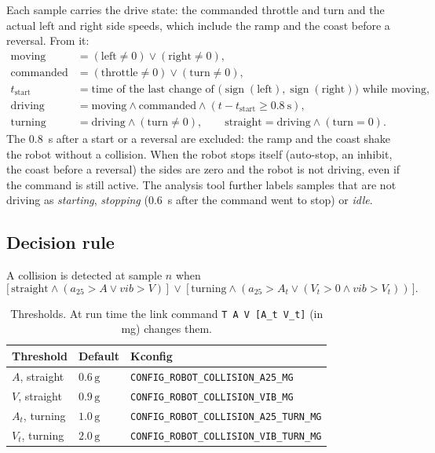 \documentclass[11pt,a4paper]{article}
\newcommand{\g}{\,\mathrm{g}}
\newcommand{\code}[1]{\texttt{#1}}
\newcommand{\azf}{a_{25}}
\newcommand{\vib}{\mathit{vib}}
\begin{document}
Each sample carries the drive state: the commanded throttle and turn and the actual left and
right side speeds, which include the ramp and the coast before a reversal. From it:
\begin{align*}
  \text{moving}    &= (\text{left} \ne 0) \lor (\text{right} \ne 0), \\
  \text{commanded} &= (\text{throttle} \ne 0) \lor (\text{turn} \ne 0), \\
  t_\text{start}   &= \text{time of the last change of }
                      \big(\operatorname{sign}(\text{left}), \operatorname{sign}(\text{right})\big)
                      \text{ while moving}, \\
  \text{driving}   &= \text{moving} \land \text{commanded} \land (t - t_\text{start} \ge
                      \SI{0.8}{\second}), \\
  \text{turning}   &= \text{driving} \land (\text{turn} \ne 0), \qquad
  \text{straight}   = \text{driving} \land (\text{turn} = 0).
\end{align*}
The \SI{0.8}{\second} after a start or a reversal are excluded: the ramp and the coast shake the
robot without a collision. When the robot stops itself (auto-stop, an inhibit, the coast before
a reversal) the sides are zero and the robot is not driving, even if the command is still
active. The analysis tool further labels samples that are not driving as \emph{starting},
\emph{stopping} (\SI{0.6}{\second} after the command went to stop) or \emph{idle}.

\subsection{Decision rule}

A collision is detected at sample $n$ when
\begin{equation}
  \big[\,\text{straight} \land (\azf > A \lor \vib > V)\,\big]
  \ \lor\
  \big[\,\text{turning} \land (\azf > A_t \lor (V_t > 0 \land \vib > V_t))\,\big] .
\end{equation}

\begin{table}[!htbp]
  \centering
  \begin{tabular}{l l l}
    \hline
    Threshold & Default & Kconfig \\
    \hline
    $A$, straight   & $0.6\g$  & \code{CONFIG\_ROBOT\_COLLISION\_A25\_MG} \\
    $V$, straight   & $0.9\g$  & \code{CONFIG\_ROBOT\_COLLISION\_VIB\_MG} \\
    $A_t$, turning  & $1.0\g$  & \code{CONFIG\_ROBOT\_COLLISION\_A25\_TURN\_MG} \\
    $V_t$, turning  & $2.0\g$  & \code{CONFIG\_ROBOT\_COLLISION\_VIB\_TURN\_MG} \\
    \hline
  \end{tabular}
  \caption{Thresholds. At run time the link command \code{T A V [A\_t V\_t]} (in mg) changes
    them.}
  \label{tab:thresholds}
\end{table}
\end{document}

